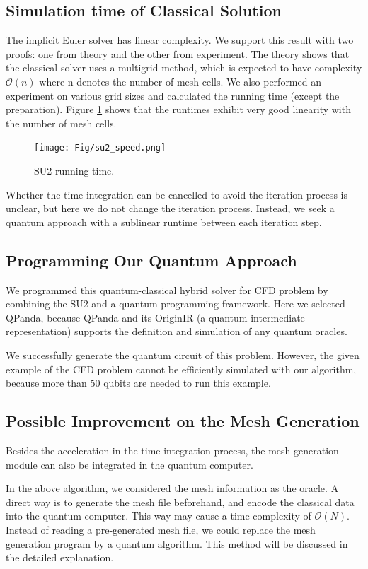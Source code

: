 \documentclass[%
 reprint,
 amsmath,amssymb,
pra,
]{revtex4-1}
\begin{document}
\subsection{Simulation time of Classical Solution}

The implicit Euler solver has linear complexity. We support this result with two proofs: one from theory and the other from experiment. The theory\cite{MultigridBook} shows that the classical solver uses a multigrid method, which is expected to have complexity $\mathcal{O}(n)$ where n denotes the number of mesh cells. We also performed an experiment on various grid sizes and calculated the running time (except the preparation). Figure \ref{su2Speed} shows that the runtimes exhibit very good linearity with the number of mesh cells.

\begin{figure} 
\centering
\texttt{[image: Fig/su2\_speed.png]}
\caption{SU2 running time.} \label{su2Speed}
\end{figure}

Whether the time integration can be cancelled to avoid the iteration process is unclear, but here we do not change the iteration process. Instead, we seek a quantum approach with a sublinear runtime between each iteration step.

\subsection{Programming Our Quantum Approach}
We programmed this quantum-classical hybrid solver for CFD problem by combining the SU2 and a quantum programming framework. Here we selected QPanda, because QPanda and its OriginIR (a quantum intermediate representation) supports the definition and simulation of any quantum oracles.

We successfully generate the quantum circuit of this problem. However, the given example of the CFD problem cannot be efficiently simulated with our algorithm, because more than 50 qubits are needed to run this example. 

\subsection{Possible Improvement on the Mesh Generation}
Besides the acceleration in the time integration process, the mesh generation module can also be integrated in the quantum computer.

In the above algorithm, we considered the mesh information as the oracle. A direct way is to generate the mesh file beforehand, and encode the classical data into the quantum computer. This way may cause a time complexity of $\mathcal{O}(N)$. Instead of reading a pre-generated mesh file, we could replace the mesh generation program by a quantum algorithm. This method will be discussed in the detailed explanation.
\end{document}

